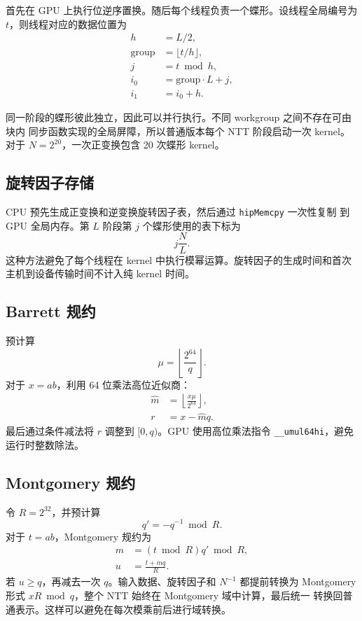 ﻿\documentclass[a4paper]{article}
\begin{document}
首先在 GPU 上执行位逆序置换。随后每个线程负责一个蝶形。设线程全局编号为
$t$，则线程对应的数据位置为
\begin{align}
h &= L/2,\\
\text{group} &= \lfloor t/h\rfloor,\\
j &= t\bmod h,\\
i_0 &= \text{group}\cdot L+j,\\
i_1 &= i_0+h.
\end{align}

同一阶段的蝶形彼此独立，因此可以并行执行。不同 workgroup 之间不存在可由块内
同步函数实现的全局屏障，所以普通版本每个 NTT 阶段启动一次 kernel。对于
$N=2^{20}$，一次正变换包含 20 次蝶形 kernel。

\subsection{旋转因子存储}

CPU 预先生成正变换和逆变换旋转因子表，然后通过 \texttt{hipMemcpy} 一次性复制
到 GPU 全局内存。第 $L$ 阶段第 $j$ 个蝶形使用的表下标为
\[
j\frac{N}{L}.
\]
这种方法避免了每个线程在 kernel 中执行模幂运算。旋转因子的生成时间和首次
主机到设备传输时间不计入纯 kernel 时间。

\subsection{Barrett 规约}

预计算
\[
\mu=\left\lfloor\frac{2^{64}}{q}\right\rfloor.
\]
对于 $x=ab$，利用 64 位乘法高位近似商：
\begin{align}
\widehat{m} &= \left\lfloor\frac{x\mu}{2^{64}}\right\rfloor,\\
r &= x-\widehat{m}q.
\end{align}
最后通过条件减法将 $r$ 调整到 $[0,q)$。GPU 使用高位乘法指令
\texttt{\_\_umul64hi}，避免运行时整数除法。

\subsection{Montgomery 规约}

令 $R=2^{32}$，并预计算
\[
q'=-q^{-1}\bmod R.
\]
对于 $t=ab$，Montgomery 规约为
\begin{align}
m &= (t\bmod R)q'\bmod R,\\
u &= \frac{t+mq}{R}.
\end{align}
若 $u\ge q$，再减去一次 $q$。输入数据、旋转因子和 $N^{-1}$ 都提前转换为
Montgomery 形式 $xR\bmod q$，整个 NTT 始终在 Montgomery 域中计算，最后统一
转换回普通表示。这样可以避免在每次模乘前后进行域转换。
\end{document}
